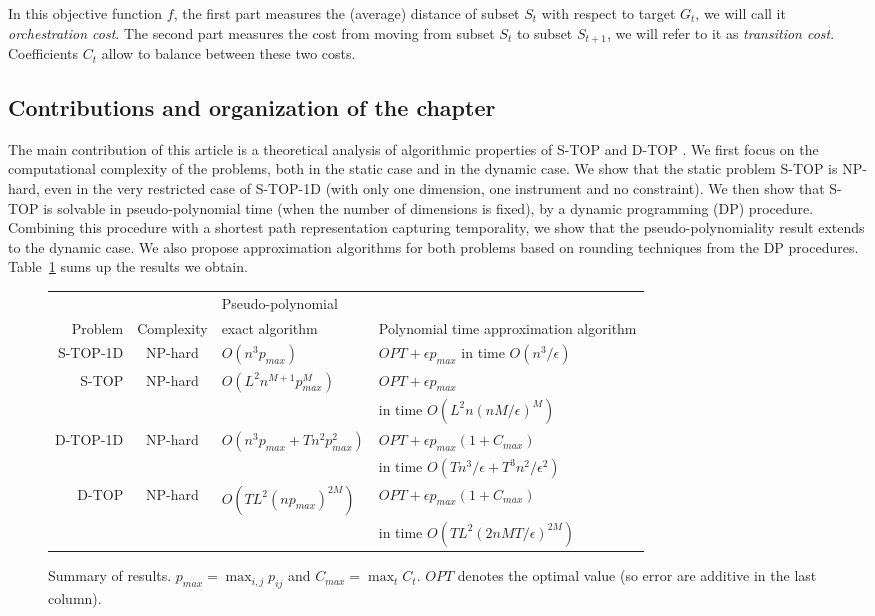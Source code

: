 \documentclass[a4paper]{book}
\newcommand{\stat}{{\sc S-TOP }}
\newcommand{\statoned}{{\sc S-TOP-1D }}
\newcommand{\dyn}{{\sc D-TOP }}
\newcommand{\dynoned}{{\sc D-TOP-1D }}
\begin{document}
In this objective function $f$, the first part measures the (average) distance of subset $S_t$ with respect to target $G_t$, we will call it {\it orchestration cost}. The second part measures  the cost from moving from subset $S_t$ to subset $S_{t+1}$, we will refer to it as {\it transition cost}. Coefficients $C_t$ allow to balance between these two costs.

\subsection{Contributions and organization of the chapter}

The main contribution of this article is a theoretical analysis of algorithmic properties of \stat and \dyn. We first focus on the computational complexity of the problems, both in the static case and in the dynamic case. We show that the static problem \stat is NP-hard, even in the very restricted case of \statoned (with only one dimension, one instrument and no constraint). 
We then show that \stat is solvable in pseudo-polynomial time (when the number of dimensions is fixed), by a dynamic programming (DP) procedure. Combining this procedure with a shortest path representation capturing temporality, we show that the pseudo-polynomiality result extends to the dynamic case. We also propose approximation algorithms for both problems based on rounding techniques from the DP procedures. Table~\ref{table:results} sums up the results we obtain.
\begin{figure}
\begin{tabular}{r||c|l|l}
     &   & Pseudo-polynomial & \\
        Problem  & Complexity  & exact algorithm &  Polynomial time approximation algorithm\\
     \hline \hline
     \statoned &  NP-hard & $O(n^3p_{max})$ & $OPT+\epsilon p_{max}$ in time $O(n^3/\epsilon)$ \\ \hline
          \stat &  NP-hard & $O(L^2n^{M+1}p_{max}^M)$ & $OPT+\epsilon p_{max}$ \\ 
                     &   &  &  in time $O(L^2n(nM/\epsilon)^M)$ \\ \hline
               \dynoned &  NP-hard & $O(n^3p_{max}+Tn^2p_{max}^2)$ & $OPT+\epsilon p_{max}(1+C_{max})$  \\   &  &  &  in time $O(Tn^3/\epsilon+T^3n^2/\epsilon^2)$ \\
               \hline
     \dyn &  NP-hard & $O(TL^2(np_{max})^{2M})$ & $OPT+\epsilon p_{max}(1+C_{max})$ \\ 
           &   &  & in time $O(TL^2(2nMT/\epsilon)^{2M})$ \\ \hline
\end{tabular}
\caption{Summary of results. $p_{max}=\max_{i,j} p_{ij}$ and $C_{max}=\max_{t}C_t$. $OPT$ denotes the optimal value (so error are additive in the last column).}\label{table:results}
\end{figure}
\end{document}
